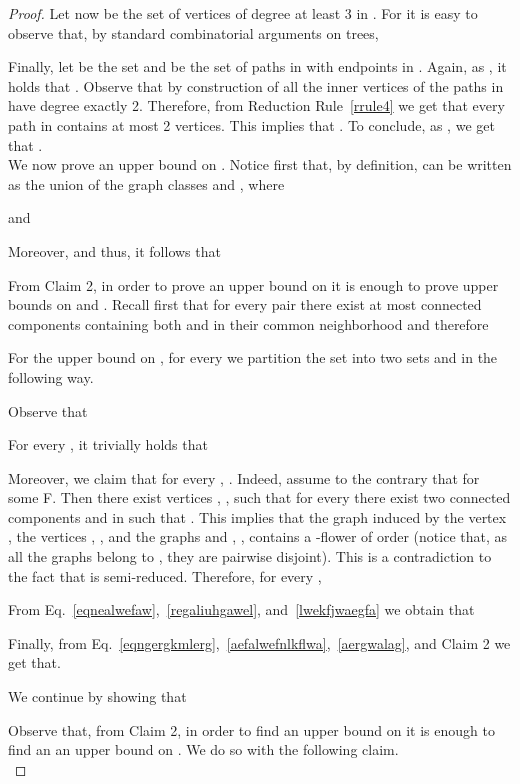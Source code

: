 \documentclass[a4paper,11pt]{article}
\begin{document}
\begin{proof}
Let now  be the set of vertices of degree at least 3 in . For  it is easy to observe that, by standard combinatorial arguments on trees, 


Finally, let  be the set  and  be the set of paths in  with endpoints in . Again, as , it holds
that .
Observe that by construction of  all the inner vertices of the paths in  have degree exactly 2. Therefore, from Reduction Rule~\ref{rrule4} we get that every path in  contains at most 2 vertices. This implies that .
To conclude, as , we get that .
 \hfill \\

\noindent We now prove an upper bound on . 
Notice first that, by definition,  can be written as the union of the graph classes  and , where 

and

Moreover,  and thus, it follows that 



\noindent From Claim 2, in order to prove an upper bound on  it is enough to prove upper bounds on  and .
Recall first that for every pair  there exist at most  connected components containing both  and  in their
common neighborhood and therefore 

\noindent For the upper bound on , for every  we partition the set 
into two sets  and  in the following way.

Observe that 
 
For every , it trivially holds that 

Moreover, we claim that for every , . Indeed, assume to the contrary that  for some F.
Then there exist  vertices , , such that
for every  there exist two connected components  and  in  such that 
. This implies that the graph induced by the vertex , the vertices , , and the
graphs  and , , contains a -flower of order  (notice that, as all the graphs belong to , 
they are pairwise disjoint). This is a contradiction to the fact that  is semi-reduced.
Therefore, for every ,

From Eq.~\eqref{eqnealwefaw},~\eqref{regaliuhgawel}, and~\eqref{lwekfjwaegfa} we obtain that

Finally, from Eq.~\eqref{eqngergkmlerg},~\eqref{aefalwefnlkflwa},~\eqref{aergwalag}, and Claim 2 we get that.



\noindent We continue by showing that 

\noindent Observe that, from Claim 2, in order to find an upper bound on  it is enough to 
find an an upper bound on .
We do so with the following claim.\\


\end{proof}
\end{document}
